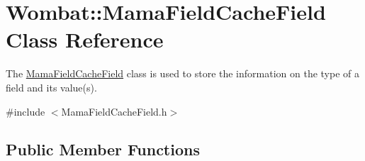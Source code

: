 \hypertarget{classWombat_1_1MamaFieldCacheField}{
\section{Wombat::MamaFieldCacheField Class Reference}
\label{classWombat_1_1MamaFieldCacheField}
}


The {\ttfamily \hyperlink{classWombat_1_1MamaFieldCacheField}{MamaFieldCacheField}} class is used to store the information on the type of a field and its value(s).  


{\ttfamily \#include $<$MamaFieldCacheField.h$>$}\subsection*{Public Member Functions}
